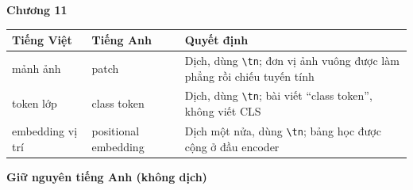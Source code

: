 \bigskip
\textbf{Chương 11}

\footnotesize
\begin{tabular}{@{}llp{4cm}@{}}
\toprule
Tiếng Việt & Tiếng Anh & Quyết định \\
\midrule
mảnh ảnh & patch & Dịch, dùng \texttt{\textbackslash tn}; đơn vị ảnh vuông được làm phẳng rồi chiếu tuyến tính \\
token lớp & class token & Dịch, dùng \texttt{\textbackslash tn}; bài viết \enquote{class token}, không viết CLS \\
embedding vị trí & positional embedding & Dịch một nửa, dùng \texttt{\textbackslash tn}; bảng học được cộng ở đầu encoder \\
\bottomrule
\end{tabular}
\normalsize

\bigskip
\textbf{Giữ nguyên tiếng Anh (không dịch)}

